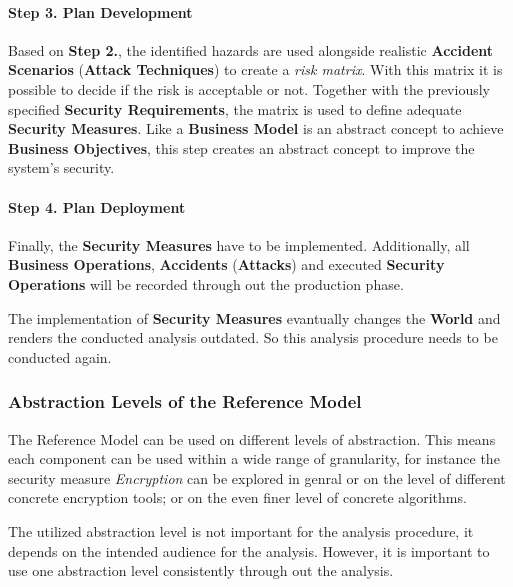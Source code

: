 \paragraph{Step 3. Plan Development}

Based on \textbf{Step 2.}, the identified hazards are used alongside
realistic \textbf{Accident Scenarios} (\textbf{Attack Techniques}) to
create a \emph{risk matrix}. With this matrix it is possible to decide
if the risk is acceptable or not. Together with the previously specified
\textbf{Security Requirements}, the matrix is used to define adequate
\textbf{Security Measures}. Like a \textbf{Business Model} is an
abstract concept to achieve \textbf{Business Objectives}, this step
creates an abstract concept to improve the system's security.

\paragraph{Step 4. Plan Deployment}

Finally, the \textbf{Security Measures} have to be implemented.
Additionally, all \textbf{Business Operations}, \textbf{Accidents}
(\textbf{Attacks}) and executed \textbf{Security Operations} will be
recorded through out the production phase.

The implementation of \textbf{Security Measures} evantually changes the
\textbf{World} and renders the conducted analysis outdated. So this
analysis procedure needs to be conducted again.

\subsubsection{Abstraction Levels of the Reference Model}

The Reference Model can be used on different levels of abstraction. This
means each component can be used within a wide range of granularity, for
instance the security measure \emph{Encryption} can be explored in
genral or on the level of different concrete encryption tools; or on the
even finer level of concrete algorithms.

The utilized abstraction level is not important for the analysis
procedure, it depends on the intended audience for the analysis.
However, it is important to use one abstraction level consistently
through out the analysis.


\pagebreak

